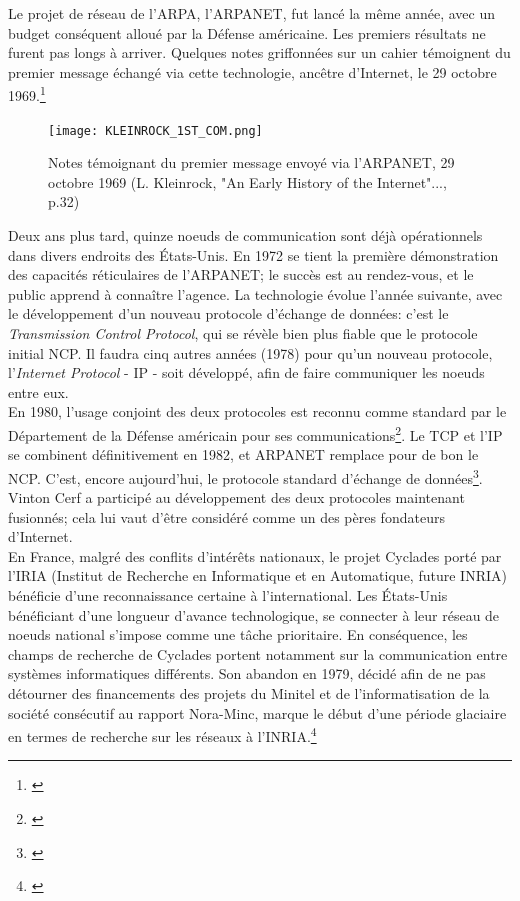 \documentclass[a4paper,12pt,twoside]{book}
\begin{document}
Le projet de réseau de l'ARPA, l'ARPANET, fut lancé la même année, avec un budget conséquent alloué par la Défense américaine. Les premiers résultats ne furent pas longs à arriver. Quelques notes griffonnées sur un cahier témoignent du premier message échangé via cette technologie, ancêtre d'Internet, le 29 octobre 1969.\footnote{\cite[p.~32]{kleinrockEarlyHistoryInternet2010}}\\
\begin{figure}[h]
    \centering
    \texttt{[image: KLEINROCK\_1ST\_COM.png]}
    \caption{Notes témoignant du premier message envoyé via l'ARPANET, 29 octobre 1969 (L. Kleinrock, "An Early History of the Internet"..., p.32)}
    \label{fig:enter-label}
\end{figure}

Deux ans plus tard, quinze noeuds de communication sont déjà opérationnels dans divers endroits des États-Unis. En 1972 se tient la première démonstration des capacités réticulaires de l'ARPANET; le succès est au rendez-vous, et le public apprend à connaître l'agence. La technologie évolue l'année suivante, avec le développement d'un nouveau protocole d'échange de données: c'est le \textit{Transmission Control Protocol}, qui se révèle bien plus fiable que le protocole initial NCP. Il faudra cinq autres années (1978) pour qu'un nouveau protocole, l'\textit{Internet Protocol} - IP - soit développé, afin de faire communiquer les noeuds entre eux.\\

En 1980, l'usage conjoint des deux protocoles est reconnu comme standard par le Département de la Défense américain pour ses communications\footnote{\cite[p.~34-35]{kleinrockEarlyHistoryInternet2010}}. Le TCP et l'IP se combinent définitivement en 1982, et ARPANET remplace pour de bon le NCP. C'est, encore aujourd'hui, le protocole standard d'échange de données\footnote{\cite[p.~16-17]{ceruzziAuxOriginesAmericaines2012}}. Vinton Cerf a participé au développement des deux protocoles maintenant fusionnés; cela lui vaut d'être considéré comme un des pères fondateurs d'Internet.\\

En France, malgré des conflits d'intérêts nationaux, le projet Cyclades porté par l'IRIA (Institut de Recherche en Informatique et en Automatique, future INRIA) bénéficie d'une reconnaissance certaine à l'international. Les États-Unis bénéficiant d'une longueur d'avance technologique, se connecter à leur réseau de noeuds national s'impose comme une tâche prioritaire. En conséquence, les champs de recherche de Cyclades portent notamment sur la communication entre systèmes informatiques différents. Son abandon en 1979, décidé afin de ne pas détourner des financements des projets du Minitel et de l'informatisation de la société consécutif au rapport Nora-Minc, marque le début d'une \og période glaciaire \fg{} en termes de recherche sur les réseaux à l'INRIA.\footnote{\cite[p.~41-45]{grisetMakePigFly2012}}\\
\end{document}
